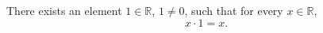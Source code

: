 There exists an element $1 \in \mathbb{R}$, $1 \neq 0$, such that for every $x \in \mathbb{R}$,
\begin{equation*}
x \cdot 1 = x.
\end{equation*}

